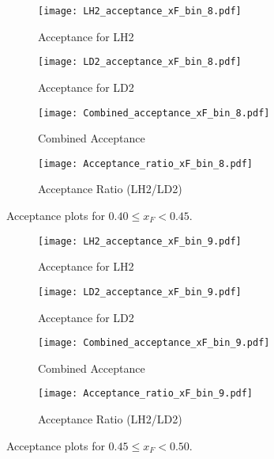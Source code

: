 \documentclass{article}
\begin{document}
\begin{figure}[H]
    \centering
    \begin{subfigure}[b]{0.48\textwidth}
       \texttt{[image: LH2\_acceptance\_xF\_bin\_8.pdf]}
       \caption{Acceptance for LH2}
    \end{subfigure}
    \hfill
    \begin{subfigure}[b]{0.48\textwidth}
       \texttt{[image: LD2\_acceptance\_xF\_bin\_8.pdf]}
       \caption{Acceptance for LD2}
    \end{subfigure}

    \begin{subfigure}[b]{0.48\textwidth}
       \texttt{[image: Combined\_acceptance\_xF\_bin\_8.pdf]}
       \caption{Combined Acceptance}
    \end{subfigure}
    \hfill
    \begin{subfigure}[b]{0.48\textwidth}
       \texttt{[image: Acceptance\_ratio\_xF\_bin\_8.pdf]}
       \caption{Acceptance Ratio (LH2/LD2)}
    \end{subfigure}
    \caption{Acceptance plots for $0.40 \le x_F < 0.45$.}
\end{figure}

\begin{figure}[H]
    \centering
    \begin{subfigure}[b]{0.48\textwidth}
       \texttt{[image: LH2\_acceptance\_xF\_bin\_9.pdf]}
       \caption{Acceptance for LH2}
    \end{subfigure}
    \hfill
    \begin{subfigure}[b]{0.48\textwidth}
       \texttt{[image: LD2\_acceptance\_xF\_bin\_9.pdf]}
       \caption{Acceptance for LD2}
    \end{subfigure}

    \begin{subfigure}[b]{0.48\textwidth}
       \texttt{[image: Combined\_acceptance\_xF\_bin\_9.pdf]}
       \caption{Combined Acceptance}
    \end{subfigure}
    \hfill
    \begin{subfigure}[b]{0.48\textwidth}
       \texttt{[image: Acceptance\_ratio\_xF\_bin\_9.pdf]}
       \caption{Acceptance Ratio (LH2/LD2)}
    \end{subfigure}
    \caption{Acceptance plots for $0.45 \le x_F < 0.50$.}
\end{figure}
\end{document}
